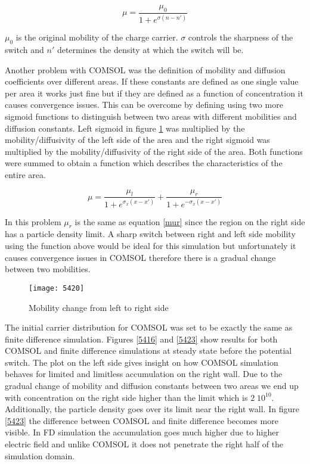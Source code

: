 \begin{equation}
\mu = \frac{\mu_{0}}{1+e^{\sigma(n-n')}}
\label{mur}
\end{equation} 

$\mu_0$ is the original mobility of the charge carrier. $\sigma$ controls the sharpness of the switch and $n'$ determines the density at which the switch will be. 

Another problem with COMSOL was the definition of mobility and diffusion coefficients over different areas. If these constants are defined as one single value per area it works just fine but if they are defined as a function of concentration it causes convergence issues. This can be overcome by defining using two more sigmoid functions to distinguish between two areas with different mobilities and diffusion constants. Left sigmoid in figure \ref{5420}  was multiplied by the mobility/diffusivity of the left side of the area and the right sigmoid was multiplied by the mobility/diffusivity of the right side of the area. Both functions were summed to obtain a function which describes the characteristics of the entire area.

\begin{equation}
\mu=\frac{\mu_{l}}{1+e^{\sigma_x(x-x')}}+\frac{\mu_{r}}{1+e^{-\sigma_x(x-x')}}
\end{equation}

In this problem $\mu_r$ is the same as equation \ref{mur} since the region on the right side has a particle density limit. A sharp switch between right and left side mobility using the function above would be ideal for this simulation but unfortunately it causes convergence issues in COMSOL therefore there is a gradual change between two mobilities. 

\begin{figure}[!htp]
\centering
\texttt{[image: 5420]}
\caption{Mobility change from left to right side} 
\label{5420}
\end{figure}

The initial carrier distribution for COMSOL was set to be exactly the same as finite difference simulation. Figures \ref{5416} and \ref{5423} show results for both COMSOL and finite difference simulations at steady state before the potential switch. The plot on the left side gives insight on how COMSOL simulation behaves for limited and limitless accumulation on the right wall. Due to the gradual change of mobility and diffusion constants between two areas we end up with concentration on the right side higher than the limit which is $2 \; 10^{10}$. Additionally, the particle density goes over its limit near the right wall. In figure \ref{5423} the difference between COMSOL and finite difference becomes more visible. In FD simulation the accumulation goes much higher due to higher electric field and unlike COMSOL it does not penetrate the right half of the simulation domain. 

